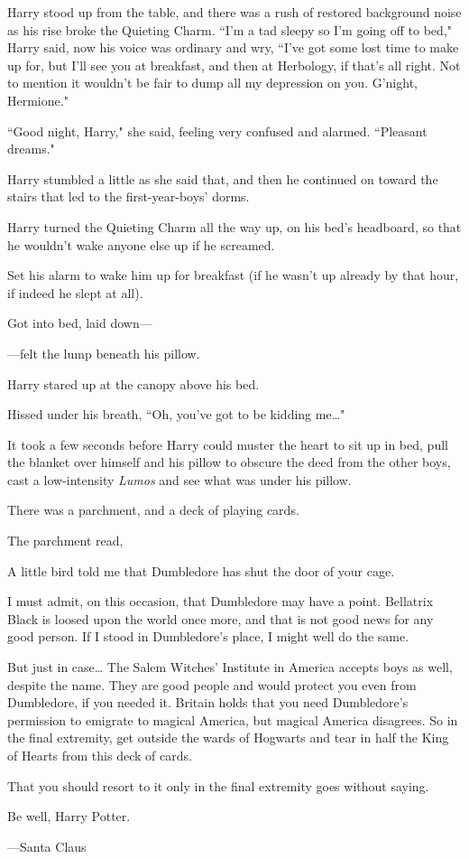 Harry stood up from the table, and there was a rush of restored background noise as his rise broke the Quieting Charm. ``I'm a tad sleepy so I'm going off to bed," Harry said, now his voice was ordinary and wry, ``I've got some lost time to make up for, but I'll see you at breakfast, and then at Herbology, if that's all right. Not to mention it wouldn't be fair to dump all my depression on you. G'night, Hermione."

``Good night, Harry," she said, feeling very confused and alarmed. ``Pleasant dreams."

Harry stumbled a little as she said that, and then he continued on toward the stairs that led to the first-year-boys' dorms.

\later

Harry turned the Quieting Charm all the way up, on his bed's headboard, so that he wouldn't wake anyone else up if he screamed.

Set his alarm to wake him up for breakfast (if he wasn't up already by that hour, if indeed he slept at all).

Got into bed, laid down---

---felt the lump beneath his pillow.

Harry stared up at the canopy above his bed.

Hissed under his breath, ``Oh, you've got to be kidding me{\ldots}"

It took a few seconds before Harry could muster the heart to sit up in bed, pull the blanket over himself and his pillow to obscure the deed from the other boys, cast a low-intensity \emph{Lumos} and see what was under his pillow.

There was a parchment, and a deck of playing cards.

The parchment read,

\begin{writtenNote}
A little bird told me that Dumbledore has shut the door of your cage.

I must admit, on this occasion, that Dumbledore may have a point. Bellatrix Black is loosed upon the world once more, and that is not good news for any good person. If I stood in Dumbledore's place, I might well do the same.

But just in case{\ldots} The Salem Witches' Institute in America accepts boys as well, despite the name. They are good people and would protect you even from Dumbledore, if you needed it. Britain holds that you need Dumbledore's permission to emigrate to magical America, but magical America disagrees. So in the final extremity, get outside the wards of Hogwarts and tear in half the King of Hearts from this deck of cards.

That you should resort to it only in the final extremity goes without saying.

Be well, Harry Potter.

---Santa Claus
\end{writtenNote}

